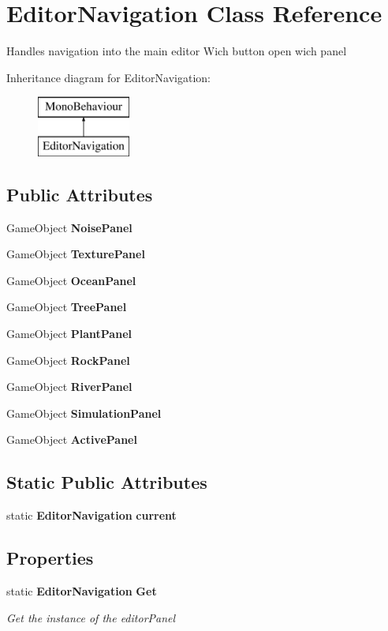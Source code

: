 \section{Editor\+Navigation Class Reference}
\label{class_editor_navigation}


Handles navigation into the main editor Wich button open wich panel  


Inheritance diagram for Editor\+Navigation\+:\begin{figure}[H]
\begin{center}
\leavevmode
\includegraphics[height=2.000000cm]{class_editor_navigation}
\end{center}
\end{figure}
\subsection*{Public Attributes}
\begin{DoxyCompactItemize}
\item 
Game\+Object \textbf{ Noise\+Panel}
\item 
Game\+Object \textbf{ Texture\+Panel}
\item 
Game\+Object \textbf{ Ocean\+Panel}
\item 
Game\+Object \textbf{ Tree\+Panel}
\item 
Game\+Object \textbf{ Plant\+Panel}
\item 
Game\+Object \textbf{ Rock\+Panel}
\item 
Game\+Object \textbf{ River\+Panel}
\item 
Game\+Object \textbf{ Simulation\+Panel}
\item 
Game\+Object \textbf{ Active\+Panel}
\end{DoxyCompactItemize}
\subsection*{Static Public Attributes}
\begin{DoxyCompactItemize}
\item 
static \textbf{ Editor\+Navigation} \textbf{ current}
\end{DoxyCompactItemize}
\subsection*{Properties}
\begin{DoxyCompactItemize}
\item 
static \textbf{ Editor\+Navigation} \textbf{ Get}\hspace{0.3cm}{\ttfamily  [get]}
\begin{DoxyCompactList}\small\item\em Get the instance of the editor\+Panel \end{DoxyCompactList}\end{DoxyCompactItemize}


